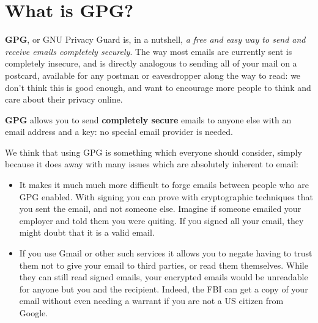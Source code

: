 
\section{What is GPG?}

\textbf{GPG}, or GNU Privacy Guard is, in a nutshell, \textit{a free and easy way to send and receive emails completely securely}. The way most emails are currently sent is completely insecure, and is directly analogous to sending all of your mail on a postcard, available for any postman or eavesdropper along the way to read: we don't think this is good enough, and want to encourage more people to think and care about their privacy online.

\textbf{GPG} allows you to send \textbf{completely secure} emails to anyone else with an email address and a key: no special email provider is needed.

We think that using GPG is something which everyone should consider, simply because it does away with many issues which are absolutely inherent to email:

\begin{itemize}
	\item It makes it much much more difficult to forge emails between people who are GPG enabled. With signing you can prove with cryptographic techniques that you sent the email, and not someone else. Imagine if someone emailed your employer and told them you were quiting. If you signed all your email, they might doubt that it is a valid email.
	\item If you use Gmail or other such services it allows you to negate having to trust them not to give your email to third parties, or read them themselves. While they can still read signed emails, your encrypted emails would be unreadable for anyone but you and the recipient. Indeed, the FBI can get a copy of your email without even needing a warrant if you are not a US citizen from Google.  
\end{itemize}

